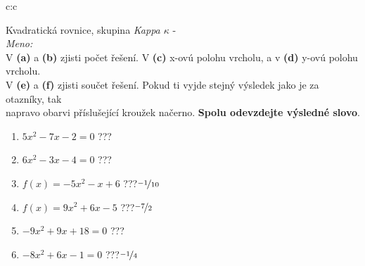 \documentclass[10pt]{report}
\begin{document}
\clearpage
\thispagestyle{empty}
\begin{tabular}{c:c}
\begin{minipage}[c][99mm][t]{0.49\linewidth}
\begin{center}
\vspace{7mm}
{\huge Kvadratická rovnice, skupina \textit{Kappa $\kappa$} -}\\[4.5mm]
\textit{Meno:}\phantom{xxxxxxxxxxxxxxxxxxxxxxxxxxxxxxxxxxxxxxxxxxxxxxxxxxxxxxxxxxxxxxxxx}\\[3.5mm]
V \textbf{(a)} a \textbf{(b)} zjisti počet řešení. V \textbf{(c)} x-ovú polohu vrcholu, a v \textbf{(d)} y-ovú polohu vrcholu.\\V \textbf{(e)} a \textbf{(f)} zjisti součet řešení. Pokud ti vyjde stejný výsledek jako je za otazníky, tak\\napravo obarvi příslušející kroužek načerno. \textbf{Spolu odevzdejte výsledné slovo}.\\[3mm]
\begin{minipage}{0.77\linewidth}
\begin{center}
\begin{varwidth}{\textwidth}
\begin{enumerate}
\large
\item $5x^2-7x-2=0$\quad \dotfill\; ???\;\dotfill {}
\item $6x^2-3x-4=0$\quad \dotfill\; ???\;\dotfill {}
\item $f(x)=-5x^2-x+6$\quad \dotfill\; ???\;\dotfill \quad $\nicefrac{-1}{10}$
\item $f(x)=9x^2+6x-5$\quad \dotfill\; ???\;\dotfill \quad $\nicefrac{-7}{2}$
\item $-9x^2+9x+18=0$\quad \dotfill\; ???\;\dotfill {}
\item $-8x^2+6x-1=0$\quad \dotfill\; ???\;\dotfill \quad $\nicefrac{-1}{4}$
\end{enumerate}
\end{varwidth}
\end{center}
\end{minipage}

\end{center}
\end{minipage}
\end{tabular}
\end{document}
